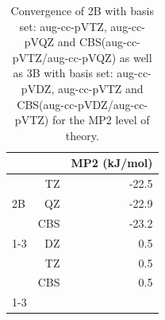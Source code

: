 \begin{table}[h]

\caption{\label{tab:benzene_basis_conv}Convergence of 2B with basis set: aug-cc-pVTZ, aug-cc-pVQZ and CBS(aug-cc-pVTZ/aug-cc-pVQZ) as well as 3B with basis set: aug-cc-pVDZ, aug-cc-pVTZ and CBS(aug-cc-pVDZ/aug-cc-pVTZ) for the MP2 level of theory.}
\begin{tabular}{lrr}
\toprule
 &  & MP2 (kJ/mol) \\ 
\midrule
\multirow[c]{3}{*}{2B} & TZ & -22.5 \\
 & QZ & -22.9 \\
 & CBS & -23.2 \\
\cline{1-3}
\multirow[c]{3}{*}{3B} & DZ & 0.5 \\
 & TZ & 0.5 \\
 & CBS & 0.5 \\
\cline{1-3}
\bottomrule
\end{tabular}

\end{table}